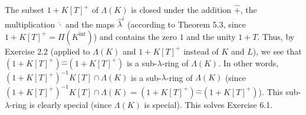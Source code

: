 \documentclass[numbers=enddot,12pt,final,onecolumn,notitlepage]{scrartcl}%
\begin{document}
The subset $1+K\left[  T\right]  ^{+}$ of $\Lambda\left(  K\right)  $ is
closed under the addition $\widehat{+}$, the multiplication $\widehat{\cdot}$
and the maps $\widehat{\lambda}^{i}$ (according to Theorem 5.3, since
$1+K\left[  T\right]  ^{+}=\Pi\left(  K^{\operatorname*{int}}\right)  $) and
contains the zero $1$ and the unity $1+T$. Thus, by Exercise 2.2 (applied to
$\Lambda\left(  K\right)  $ and $1+K\left[  T\right]  ^{+}$ instead of $K$ and
$L$), we see that $\left(  1+K\left[  T\right]  ^{+}\right)  \widehat{-}%
\left(  1+K\left[  T\right]  ^{+}\right)  $ is a sub-$\lambda$-ring of
$\Lambda\left(  K\right)  $. In other words, $\left(  1+K\left[  T\right]
^{+}\right)  ^{-1}K\left[  T\right]  \cap\Lambda\left(  K\right)  $ is a
sub-$\lambda$-ring of $\Lambda\left(  K\right)  $ (since $\left(  1+K\left[
T\right]  ^{+}\right)  ^{-1}K\left[  T\right]  \cap\Lambda\left(  K\right)
=\left(  1+K\left[  T\right]  ^{+}\right)  \widehat{-}\left(  1+K\left[
T\right]  ^{+}\right)  $). This sub-$\lambda$-ring is clearly special (since
$\Lambda\left(  K\right)  $ is special). This solves Exercise 6.1.
\end{document}
